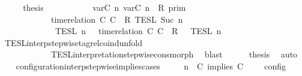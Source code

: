 \begin{isabellebody}
\ \ \isamarkupfalse%
\ \isamarkupfalse%
\ {\isacharquery}thesis\isanewline
\ \ \isamarkupfalse%
\ {\isacharminus}\isanewline
\ \ \ \ \isamarkupfalse%
\ {\isacartoucheopen}{\isasymlbrakk}\ {\isasymlfloor}{\isasymtau}\isactrlsub v\isactrlsub a\isactrlsub r{\isacharparenleft}C\ n{\isacharparenright}{\isacharcomma}\ {\isasymtau}\isactrlsub v\isactrlsub a\isactrlsub r{\isacharparenleft}C\ n{\isacharparenright}{\isasymrfloor}\ {\isasymin}\ R\ {\isasymrbrakk}\isactrlsub p\isactrlsub r\isactrlsub i\isactrlsub m\isanewline
\ \ \ \ \ \ \ \ \ \ {\isasyminter}\ {\isasymlbrakk}\ time{\isacharminus}relation\ {\isasymlfloor}C\ C\ {\isasymin}\ R\ {\isasymrbrakk}\isactrlsub T\isactrlsub E\isactrlsub S\isactrlsub L\isactrlbsup {\isasymge}\ Suc\ n\isactrlesup \isanewline
\ \ \ \ \ \ \ \ \ \ {\isasyminter}\ {\isasymlbrakk}{\isasymlbrakk}\ {\isasymPsi}\ {\isasymrbrakk}{\isasymrbrakk}\isactrlsub T\isactrlsub E\isactrlsub S\isactrlsub L\isactrlbsup {\isasymge}\ n\isactrlesup \ {\isacharequal}\ {\isasymlbrakk}{\isasymlbrakk}\ {\isacharparenleft}time{\isacharminus}relation\ {\isasymlfloor}C\ C\ {\isasymin}\ R{\isacharparenright}\ {\isacharhash}\ {\isasymPsi}\ {\isasymrbrakk}{\isasymrbrakk}\isactrlsub T\isactrlsub E\isactrlsub S\isactrlsub L\isactrlbsup {\isasymge}\ n\isactrlesup {\isacartoucheclose}\isanewline
\ \ \ \ \ \ \isamarkupfalse%
\ TESL{\isacharunderscore}interp{\isacharunderscore}stepwise{\isacharunderscore}tagrel{\isacharunderscore}coind{\isacharunderscore}unfold\isanewline
\ \ \ \ \ \ \ \ \ \ \ \ TESL{\isacharunderscore}interpretation{\isacharunderscore}stepwise{\isacharunderscore}cons{\isacharunderscore}morph\ \isamarkupfalse%
\ blast\isanewline
\ \ \ \ \isamarkupfalse%
\ {\isacharquery}thesis\ \isamarkupfalse%
\ auto\isanewline
\ \ \isamarkupfalse%
\isanewline
{}\isamarkupfalse%
%
\endisatagproof
{\isafoldproof}%
%
\isadelimproof
\isanewline
%
\endisadelimproof
\isanewline
{}\isamarkupfalse%
\ configuration{\isacharunderscore}interp{\isacharunderscore}stepwise{\isacharunderscore}implies{\isacharunderscore}cases{\isacharcolon}\isanewline
\ \ \ {\isacartoucheopen}{\isasymlbrakk}\ {\isasymGamma}{\isacharcomma}\ n\ {\isasymTurnstile}\ {\isacharparenleft}{\isacharparenleft}C\ implies\ C\ {\isacharhash}\ {\isasymPsi}{\isacharparenright}\ {\isasymtriangleright}\ {\isasymPhi}\ {\isasymrbrakk}\isactrlsub c\isactrlsub o\isactrlsub n\isactrlsub f\isactrlsub i\isactrlsub g\isanewline

\end{isabellebody}
